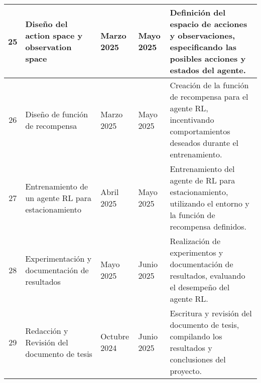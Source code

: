 \begin{center}
\begin{tabularx}{\textwidth}{|c|p{4cm}|p{1cm}|p{1cm}|X|}
        \hline
        25 & Diseño del action space y observation space & Marzo 2025 & Mayo 2025 & Definición del espacio de acciones y observaciones, especificando las posibles acciones y estados del agente. \\
        \hline
        26 & Diseño de función de recompensa & Marzo 2025 & Mayo 2025 & Creación de la función de recompensa para el agente RL, incentivando comportamientos deseados durante el entrenamiento. \\
        \hline
        27 & Entrenamiento de un agente RL para estacionamiento & Abril 2025 & Mayo 2025 & Entrenamiento del agente de RL para estacionamiento, utilizando el entorno y la función de recompensa definidos. \\
        \hline
        28 & Experimentación y documentación de resultados & Mayo 2025 & Junio 2025 & Realización de experimentos y documentación de resultados, evaluando el desempeño del agente RL. \\
        \hline
        29 & Redacción y Revisión del documento de tesis & Octubre 2024 & Junio 2025 & Escritura y revisión del documento de tesis, compilando los resultados y conclusiones del proyecto. \\
        \hline
    \end{tabularx}
\end{center}